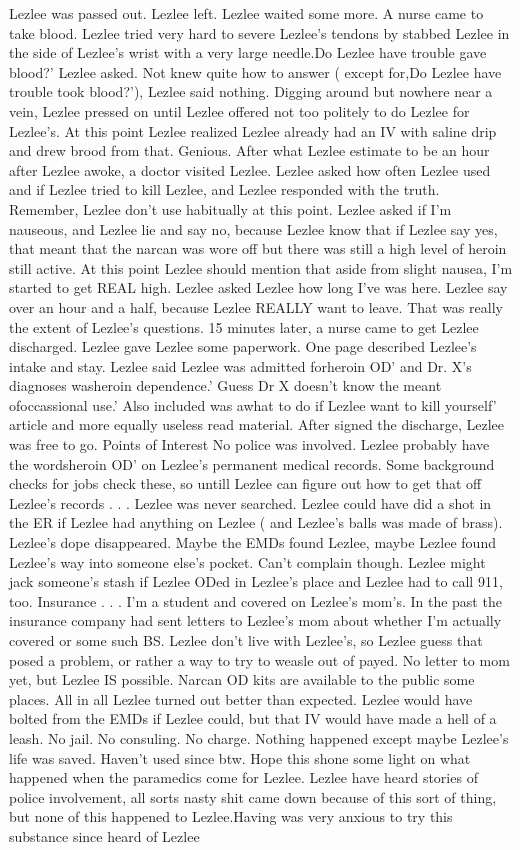 \documentclass[12pt]{book}
\begin{document}
Lezlee was passed out. Lezlee left. Lezlee waited some more. A nurse came to take blood. Lezlee tried very hard to severe Lezlee's tendons by stabbed Lezlee in the side of Lezlee's wrist with a very large needle.Do Lezlee have trouble gave blood?' Lezlee asked. Not knew quite how to answer ( except for,Do Lezlee have trouble took blood?'), Lezlee said nothing. Digging around but nowhere near a vein, Lezlee pressed on until Lezlee offered not too politely to do Lezlee for Lezlee's. At this point Lezlee realized Lezlee already had an IV with saline drip and drew brood from that. Genious. After what Lezlee estimate to be an hour after Lezlee awoke, a doctor visited Lezlee. Lezlee asked how often Lezlee used and if Lezlee tried to kill Lezlee, and Lezlee responded with the truth. Remember, Lezlee don't use habitually at this point. Lezlee asked if I'm nauseous, and Lezlee lie and say no, because Lezlee know that if Lezlee say yes, that meant that the narcan was wore off but there was still a high level of heroin still active. At this point Lezlee should mention that aside from slight nausea, I'm started to get REAL high. Lezlee asked Lezlee how long I've was here. Lezlee say over an hour and a half, because Lezlee REALLY want to leave. That was really the extent of Lezlee's questions. 15 minutes later, a nurse came to get Lezlee discharged. Lezlee gave Lezlee some paperwork. One page described Lezlee's intake and stay. Lezlee said Lezlee was admitted forheroin OD' and Dr. X's diagnoses washeroin dependence.' Guess Dr X doesn't know the meant ofoccassional use.' Also included was awhat to do if Lezlee want to kill yourself' article and more equally useless read material. After signed the discharge, Lezlee was free to go. Points of Interest No police was involved. Lezlee probably have the wordsheroin OD' on Lezlee's permanent medical records. Some background checks for jobs check these, so untill Lezlee can figure out how to get that off Lezlee's records . . .  Lezlee was never searched. Lezlee could have did a shot in the ER if Lezlee had anything on Lezlee ( and Lezlee's balls was made of brass). Lezlee's dope disappeared. Maybe the EMDs found Lezlee, maybe Lezlee found Lezlee's way into someone else's pocket. Can't complain though. Lezlee might jack someone's stash if Lezlee ODed in Lezlee's place and Lezlee had to call 911, too. Insurance . . .  I'm a student and covered on Lezlee's mom's. In the past the insurance company had sent letters to Lezlee's mom about whether I'm actually covered or some such BS. Lezlee don't live with Lezlee's, so Lezlee guess that posed a problem, or rather a way to try to weasle out of payed. No letter to mom yet, but Lezlee IS possible. Narcan OD kits are available to the public some places. All in all Lezlee turned out better than expected. Lezlee would have bolted from the EMDs if Lezlee could, but that IV would have made a hell of a leash. No jail. No consuling. No charge. Nothing happened except maybe Lezlee's life was saved. Haven't used since btw. Hope this shone some light on what happened when the paramedics come for Lezlee. Lezlee have heard stories of police involvement, all sorts nasty shit came down because of this sort of thing, but none of this happened to Lezlee.Having was very anxious to try this substance since heard of Lezlee 
\end{document}
